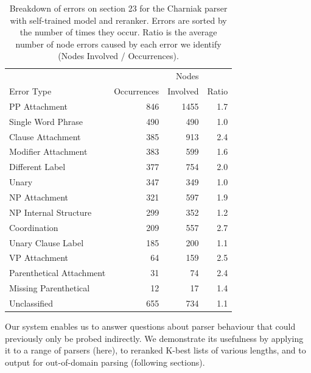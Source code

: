 \begin{table}
\begin{center}
\begin{tabular}{|lrrr|}
	\hline
		           &             & Nodes    &       \\
		Error Type & Occurrences & Involved & Ratio \\
	\hline
	\hline
		PP Attachment & 846 & 1455 & 1.7 \\
		Single Word Phrase & 490 & 490 & 1.0 \\
		Clause Attachment & 385 & 913 & 2.4 \\
		Modifier Attachment & 383 & 599 & 1.6 \\
		Different Label & 377 & 754 & 2.0 \\
		Unary & 347 & 349 & 1.0 \\
		NP Attachment & 321 & 597 & 1.9 \\
		NP Internal Structure & 299 & 352 & 1.2 \\
		Coordination & 209 & 557 & 2.7 \\
		Unary Clause Label & 185 & 200 & 1.1 \\
		VP Attachment & 64 & 159 & 2.5 \\
		Parenthetical Attachment & 31 & 74 & 2.4 \\
		Missing Parenthetical & 12 & 17 & 1.4 \\
		Unclassified & 655 & 734 & 1.1 \\
	\hline
\end{tabular}
\caption[Breakdown of errors on section 23 for the Charniak parser with self-trained model and reranker.]{ \label{tab:charniak-breakdown}
	Breakdown of errors on section 23 for the Charniak parser with self-trained model and reranker.
	Errors are sorted by the number of times they occur.
	Ratio is the average number of node errors caused by each error we identify
	(\myie Nodes Involved / Occurrences).
}
\end{center}
\end{table}

Our system enables us to answer questions about parser behaviour that could previously only be probed indirectly.
We demonstrate its usefulness by applying it to a range of parsers (here), to reranked K-best lists of various lengths, and to output for out-of-domain parsing (following sections).

\begin{landscape}





\end{landscape}

